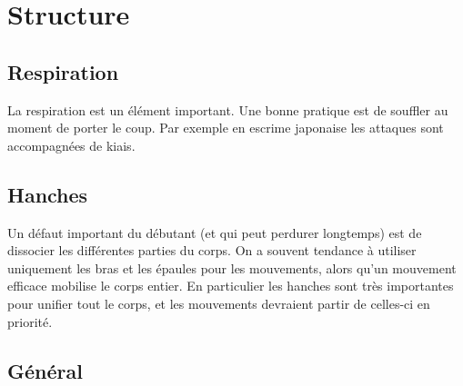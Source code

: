 \chapter{Structure}


\section{Respiration}

La respiration est un élément important. Une bonne pratique est de souffler au moment de porter le coup. Par exemple en escrime japonaise les attaques sont accompagnées de kiais.

\section{Hanches}

Un défaut important du débutant (et qui peut perdurer longtemps) est de dissocier les différentes parties du corps. On a souvent tendance à utiliser uniquement les bras et les épaules pour les mouvements, alors qu'un mouvement efficace mobilise le corps entier. En particulier les hanches sont très importantes pour unifier tout le corps, et les mouvements devraient partir de celles-ci en priorité.

\section{Général}

\cite{kohlweiss:hemac:ringen:2014}
